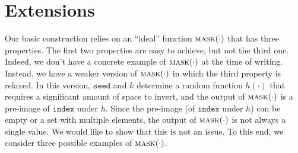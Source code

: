 \documentclass[12pt,draftcls,onecolumn]{IEEEtran}
\newcommand{\id}{\texttt{id}}
\newcommand{\seed}{\texttt{seed}}
\newcommand{\ind}{\texttt{index}}
\newcommand{\mask}{\textsc{mask}}
\begin{document}



\section{Extensions}

Our basic construction relies on an ``ideal'' function $\mask(\cdot)$ that has three properties. The first two properties are easy to achieve, but not the third one. Indeed, we don't have a concrete example of $\mask(\cdot)$ at the time of writing. Instead, we have a weaker version of $\mask(\cdot)$ in which the third property is relaxed. In this version, $\seed$ and $k$ determine a random function $h(\cdot)$ that requires a significant amount 
of space to invert, and the output of $\mask(\cdot)$ is a pre-image of $\ind$ under $h$. Since the pre-image (of $\ind$ under $h$) can be empty or a set with multiple elements, the output of $\mask(\cdot)$ is not always a single value. We would like to show that this is not an issue.
To this end, we consider three possible examples of $\mask(\cdot)$.
\end{document}
